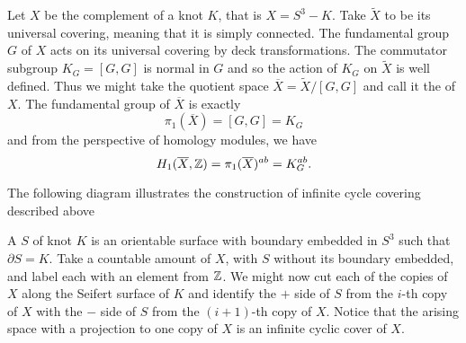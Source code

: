 Let $X$ be the complement of a knot $K$, that is $X=S^3-K$. Take $\widetilde{X}$ to be its universal covering, meaning that it is simply connected. The fundamental group $G$ of $X$ acts on its universal covering by deck transformations. The commutator subgroup $K_G=[G, G]$ is normal in $G$ and so the action of $K_G$ on $\widetilde{X}$ is well defined. Thus we might take the quotient space $\overline{X}=\widetilde{X}/[G, G]$ and call it the  of $X$. The fundamental group of $\overline{X}$ is exactly 
$$\pi_1(\overline{X})=[G, G]=K_G$$
and from the perspective of homology modules, we have
$$H_1(\overline{X}, \operatorname{\mathbb{Z}})=\pi_1(\overline{X})^{ab}=K_G^{ab}.$$

The following diagram illustrates the construction of infinite cycle covering described above

\def\actson{
  \begin{tikzpicture}[baseline]
    \draw[->](0, 0) arc (-120:180:.5em);
  \end{tikzpicture}
}

\begin{center}
\end{center}

%

A  $S$ of knot $K$ is an orientable surface with boundary embedded in $S^3$ such that $\partial S=K$. Take a countable amount of $X$, with $S$ without its boundary embedded, and label each with an element from $\operatorname{\mathbb{Z}}$. We might now cut each of the copies of $X$ along the Seifert surface of $K$ and identify the $+$ side of $S$ from the $i$-th copy of $X$ with the $-$ side of $S$ from the $(i+1)$-th copy of $X$. Notice that the arising space with a projection to one copy of $X$ is an infinite cyclic cover of $X$.

